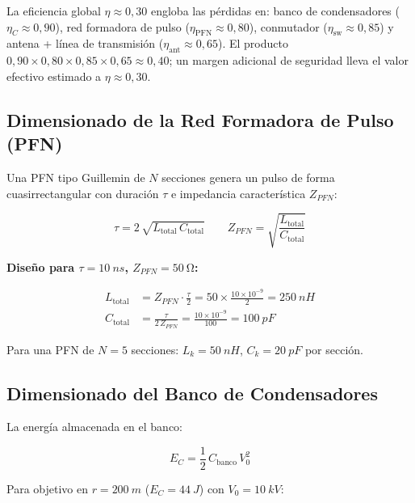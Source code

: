 \documentclass[12pt,a4paper]{article}
\begin{document}
\begin{notatec}
  La eficiencia global $\eta \approx 0{,}30$ engloba las pérdidas en:
  banco de condensadores ($\eta_C \approx 0{,}90$), red formadora de pulso
  ($\eta_\mathrm{PFN} \approx 0{,}80$), conmutador ($\eta_\mathrm{sw} \approx 0{,}85$)
  y antena + línea de transmisión ($\eta_\mathrm{ant} \approx 0{,}65$).
  El producto $0{,}90 \times 0{,}80 \times 0{,}85 \times 0{,}65 \approx 0{,}40$;
  un margen adicional de seguridad lleva el valor efectivo estimado a $\eta \approx 0{,}30$.
\end{notatec}

\subsection{Dimensionado de la Red Formadora de Pulso (PFN)}

Una PFN tipo Guillemin de $N$ secciones genera un pulso de forma
cuasirrectangular con duración $\tau$ e impedancia característica $Z_{PFN}$:

\begin{equation}
  \tau = 2\,\sqrt{L_\mathrm{total}\,C_\mathrm{total}}
  \qquad
  Z_{PFN} = \sqrt{\frac{L_\mathrm{total}}{C_\mathrm{total}}}
  \label{eq:pfn}
\end{equation}

\textbf{Diseño para $\tau = \SI{10}{ns}$, $Z_{PFN} = \SI{50}{\ohm}$:}

\begin{align}
  L_\mathrm{total} &= Z_{PFN}\cdot\frac{\tau}{2}
    = 50 \times \frac{10\times10^{-9}}{2} = \SI{250}{nH} \\[4pt]
  C_\mathrm{total} &= \frac{\tau}{2\,Z_{PFN}}
    = \frac{10\times10^{-9}}{100} = \SI{100}{pF}
\end{align}

Para una PFN de $N=5$ secciones: $L_k = \SI{50}{nH}$,
$C_k = \SI{20}{pF}$ por sección.

\subsection{Dimensionado del Banco de Condensadores}

La energía almacenada en el banco:

\begin{equation}
  E_C = \frac{1}{2}\,C_\mathrm{banco}\,V_0^2
  \label{eq:banco}
\end{equation}

Para objetivo en $r = \SI{200}{m}$ ($E_C = \SI{44}{J}$) con $V_0 = \SI{10}{kV}$:
\end{document}

